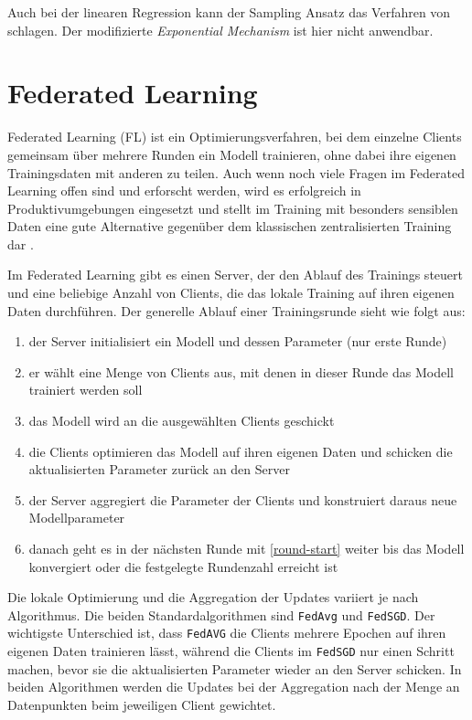 Auch bei der linearen Regression kann der Sampling Ansatz das Verfahren von \cite{alaggan:2016} schlagen. Der modifizierte \textit{Exponential Mechanism} ist hier nicht anwendbar.

\section{Federated Learning}\label{fund-fl}

Federated Learning (FL) ist ein Optimierungsverfahren, bei dem einzelne Clients gemeinsam über mehrere Runden ein Modell trainieren, ohne dabei ihre eigenen Trainingsdaten mit anderen zu teilen. Auch wenn noch viele Fragen im Federated Learning offen sind und erforscht werden, wird es erfolgreich in Produktivumgebungen eingesetzt und stellt im Training mit besonders sensiblen Daten eine gute Alternative gegenüber dem klassischen zentralisierten Training dar \cite{hard:2018, ramaswamy:2020}.

Im Federated Learning gibt es einen Server, der den Ablauf des Trainings steuert und eine beliebige Anzahl von Clients, die das lokale Training auf ihren eigenen Daten durchführen. Der generelle Ablauf einer Trainingsrunde sieht wie folgt aus: 

\begin{enumerate}
	\item der Server initialisiert ein Modell und dessen Parameter (nur erste Runde) 
	\item \label{round-start} er wählt eine Menge von Clients aus, mit denen in dieser Runde das Modell trainiert werden soll
	\item das Modell wird an die ausgewählten Clients geschickt
	\item die Clients optimieren das Modell auf ihren eigenen Daten und schicken die aktualisierten Parameter zurück an den Server
	\item der Server aggregiert die Parameter der Clients und konstruiert daraus neue Modellparameter
	\item danach geht es in der nächsten Runde mit \autoref{round-start} weiter bis das Modell konvergiert oder die festgelegte Rundenzahl erreicht ist
\end{enumerate}

Die lokale Optimierung und die Aggregation der Updates variiert je nach Algorithmus. Die beiden Standardalgorithmen sind \texttt{FedAvg} und \texttt{FedSGD}\cite{mcmahan:2016}. Der wichtigste Unterschied ist, dass \texttt{FedAVG} die Clients mehrere Epochen auf ihren eigenen Daten trainieren lässt, während die Clients im \texttt{FedSGD} nur einen Schritt machen, bevor sie die aktualisierten Parameter wieder an den Server schicken. In beiden Algorithmen werden die Updates bei der Aggregation nach der Menge an Datenpunkten beim jeweiligen Client gewichtet.

